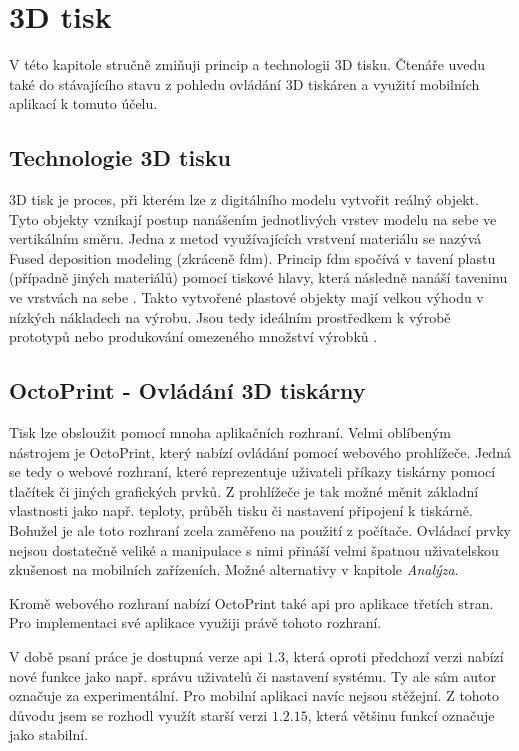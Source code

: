 \chapter{3D tisk}\label{3d-tisk}

V této kapitole stručně zmiňuji princip a technologii 3D tisku.
Čtenáře uvedu také do stávajícího stavu z pohledu ovládání 3D tiskáren a využití mobilních aplikací k tomuto účelu.

\section{Technologie 3D tisku}\label{3d-tisk-technologie}

3D tisk je proces, při kterém lze z digitálního modelu vytvořit reálný objekt.
Tyto objekty vznikají postup nanášením jednotlivých vrstev modelu na sebe ve vertikálním směru.
Jedna z metod využívajících vrstvení materiálu se nazývá Fused deposition modeling (zkráceně \acrshort{fdm}).
Princip \acrshort{fdm} spočívá v tavení plastu (případně jiných materiálů) pomocí tiskové hlavy, která následně nanáší taveninu ve vrstvách na sebe \cite{3d-print-fdm}.
Takto vytvořené plastové objekty mají velkou výhodu v nízkých nákladech na výrobu.
Jsou tedy ideálním prostředkem k výrobě prototypů nebo produkování omezeného množství výrobků \cite{3d-print-for-prototyping}.

\section{OctoPrint - Ovládání 3D tiskárny}\label{3d-tisk-ovladani}

Tisk lze obsloužit pomocí mnoha aplikačních rozhraní.
Velmi oblíbeným nástrojem je OctoPrint, který nabízí ovládání pomocí webového prohlížeče.
Jedná se tedy o webové rozhraní, které reprezentuje uživateli příkazy tiskárny pomocí tlačítek či jiných grafických prvků.
Z prohlížeče je tak možné měnit základní vlastnosti jako např. teploty, průběh tisku či nastavení připojení k tiskárně.
Bohužel je ale toto rozhraní zcela zaměřeno na použití z počítače.
Ovládací prvky nejsou dostatečně veliké a manipulace s nimi přináší velmi špatnou uživatelskou zkušenost na mobilních zařízeních.
Možné alternativy v kapitole \textit{Analýza}.

Kromě webového rozhraní nabízí OctoPrint také \acrshort{api} pro aplikace třetích stran.
Pro implementaci své aplikace využiji právě tohoto rozhraní.

V době psaní práce je dostupná verze \gls{api} $1.3$, která oproti předchozí verzi nabízí nové funkce jako např. správu uživatelů či nastavení systému.
Ty ale sám autor označuje za experimentální.
Pro mobilní aplikaci navíc nejsou stěžejní.
Z tohoto důvodu jsem se rozhodl využít starší verzi $1.2.15$, která většinu funkcí označuje jako stabilní.

